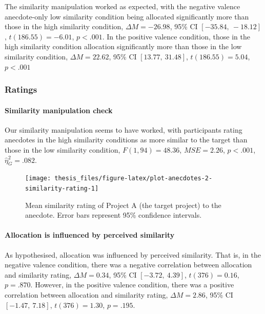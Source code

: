 \documentclass[a4paper, nobind, dvipsnames]{templates/ociamthesis}
\theoremstyle{definition}
\theoremstyle{definition}
\theoremstyle{definition}
\theoremstyle{definition}
\theoremstyle{remark}
\begin{document}
The similarity manipulation worked as expected, with the negative valence
anecdote-only low similarity condition being allocated significantly more than
those in the high similarity condition,
\(\Delta M = -26.98\), 95\% CI \([-35.84,~-18.12]\), \(t(186.55) = -6.01\), \(p < .001\). In the
positive valence condition, those in the high similarity condition allocation
significantly more than those in the low similarity condition,
\(\Delta M = 22.62\), 95\% CI \([13.77,~31.48]\), \(t(186.55) = 5.04\), \(p < .001\)

\hypertarget{ratings}{%
\subsubsection{Ratings}\label{ratings}}

\hypertarget{similarity-manipulation-check-1}{%
\paragraph{Similarity manipulation check}\label{similarity-manipulation-check-1}}

Our similarity manipulation seems to have worked, with participants rating
anecdotes in the high similarity conditions as more similar to the target than
those in the low similarity condition,
\(F(1, 94) = 48.36\), \(\mathit{MSE} = 2.26\), \(p < .001\), \(\hat{\eta}^2_G = .082\).



\begin{figure}
\texttt{[image: thesis\_files/figure-latex/plot-anecdotes-2-similarity-rating-1]} \caption{Mean similarity rating of Project A (the target project) to the anecdote. Error bars represent 95\% confidence intervals.}\label{fig:plot-anecdotes-2-similarity-rating}
\end{figure}

\hypertarget{allocation-is-influenced-by-perceived-similarity}{%
\paragraph{Allocation is influenced by perceived similarity}\label{allocation-is-influenced-by-perceived-similarity}}

As hypothesised, allocation was influenced by perceived similarity. That is, in
the negative valence condition, there was a negative correlation between
allocation and similarity rating,
\(\Delta M = 0.34\), 95\% CI \([-3.72,~4.39]\), \(t(376) = 0.16\), \(p = .870\).
However, in the positive valence condition,
there was a positive correlation between allocation and similarity rating,
\(\Delta M = 2.86\), 95\% CI \([-1.47,~7.18]\), \(t(376) = 1.30\), \(p = .195\).
\end{document}
